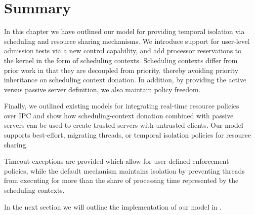 \section{Summary}

In this chapter we have outlined our model for providing temporal isolation via scheduling and
resource sharing mechanisms. We introduce support for user-level
admission tests via a new control capability, and add processor reservations to the kernel in the form of scheduling contexts.  
Scheduling contexts differ from prior work in that they are decoupled from priority, thereby
avoiding priority inheritance on scheduling context donation. In addition, by providing the active
versus passive server definition, we also maintain policy freedom.

Finally, we outlined existing models for integrating real-time resource policies over \gls{IPC} and
show how scheduling-context donation combined with passive servers can be used to create trusted
servers with untrusted clients. 
Our model supports best-effort, migrating threads, or temporal isolation policies for resource sharing.

Timeout exceptions are provided which allow for user-defined enforcement policies, while the default
mechanism maintains isolation by preventing threads from executing for more than the share of processing
time represented by the scheduling contexts.

In the next section we will outline the implementation of our model in \selfour. 
